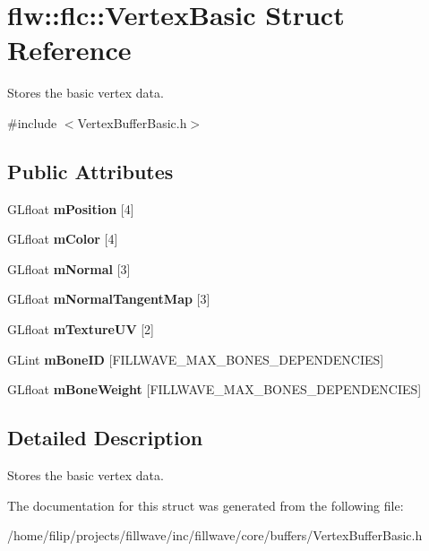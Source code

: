 \hypertarget{structflw_1_1flc_1_1VertexBasic}{}\section{flw\+:\+:flc\+:\+:Vertex\+Basic Struct Reference}
\label{structflw_1_1flc_1_1VertexBasic}


Stores the basic vertex data.  




{\ttfamily \#include $<$Vertex\+Buffer\+Basic.\+h$>$}

\subsection*{Public Attributes}
\begin{DoxyCompactItemize}
\item 
\mbox{\label{structflw_1_1flc_1_1VertexBasic_a6bde6807f2a22bfb9478f504e2efb27a}} 
G\+Lfloat {\bfseries m\+Position} \mbox{[}4\mbox{]}
\item 
\mbox{\label{structflw_1_1flc_1_1VertexBasic_a673ee06143a4bd1a30e79eb8eb55d26f}} 
G\+Lfloat {\bfseries m\+Color} \mbox{[}4\mbox{]}
\item 
\mbox{\label{structflw_1_1flc_1_1VertexBasic_ae280f116e8c4f7755f26320ccbe1f324}} 
G\+Lfloat {\bfseries m\+Normal} \mbox{[}3\mbox{]}
\item 
\mbox{\label{structflw_1_1flc_1_1VertexBasic_a803015d2ceadcca113258979fad2cea6}} 
G\+Lfloat {\bfseries m\+Normal\+Tangent\+Map} \mbox{[}3\mbox{]}
\item 
\mbox{\label{structflw_1_1flc_1_1VertexBasic_afa57fa772a09fcc3d2fa2e27d38f052b}} 
G\+Lfloat {\bfseries m\+Texture\+UV} \mbox{[}2\mbox{]}
\item 
\mbox{\label{structflw_1_1flc_1_1VertexBasic_af7b944599da3a1ccda716346a1637703}} 
G\+Lint {\bfseries m\+Bone\+ID} \mbox{[}F\+I\+L\+L\+W\+A\+V\+E\+\_\+\+M\+A\+X\+\_\+\+B\+O\+N\+E\+S\+\_\+\+D\+E\+P\+E\+N\+D\+E\+N\+C\+I\+ES\mbox{]}
\item 
\mbox{\label{structflw_1_1flc_1_1VertexBasic_ad9ce3257df1a3ff6a7664a7760f2586c}} 
G\+Lfloat {\bfseries m\+Bone\+Weight} \mbox{[}F\+I\+L\+L\+W\+A\+V\+E\+\_\+\+M\+A\+X\+\_\+\+B\+O\+N\+E\+S\+\_\+\+D\+E\+P\+E\+N\+D\+E\+N\+C\+I\+ES\mbox{]}
\end{DoxyCompactItemize}


\subsection{Detailed Description}
Stores the basic vertex data. 

The documentation for this struct was generated from the following file\+:\begin{DoxyCompactItemize}
\item 
/home/filip/projects/fillwave/inc/fillwave/core/buffers/Vertex\+Buffer\+Basic.\+h\end{DoxyCompactItemize}
